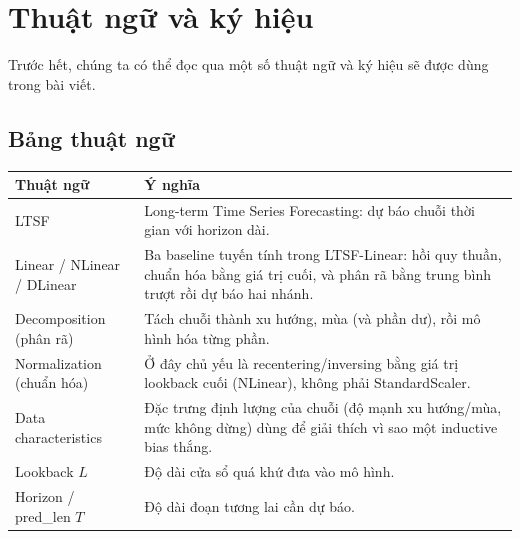 \section{Thuật ngữ và ký hiệu}
\label{sec:notation}

Trước hết, chúng ta có thể đọc qua một số thuật ngữ và ký hiệu sẽ được dùng trong bài viết.

\subsection{Bảng thuật ngữ}

\begin{center}
  \small
  \begin{tabular}{@{}>{\raggedright\arraybackslash}p{}
    >{\raggedright\arraybackslash}p{}@{}}
    \toprule
    \textbf{Thuật ngữ} & \textbf{Ý nghĩa}                                                                                        \\
    \midrule
    LTSF
                       & Long-term Time Series Forecasting: dự báo chuỗi thời gian với horizon dài.                              \\
    \addlinespace
    Linear / NLinear / DLinear
                       & Ba baseline tuyến tính trong LTSF-Linear: hồi quy thuần, chuẩn hóa bằng giá trị cuối,
    và phân rã bằng trung bình trượt rồi dự báo hai nhánh.                                                                       \\
    \addlinespace
    Decomposition (phân rã)
                       & Tách chuỗi thành xu hướng, mùa (và phần dư), rồi mô hình hóa từng phần.                                 \\
    \addlinespace
    Normalization (chuẩn hóa)
                       & Ở đây chủ yếu là recentering/inversing bằng giá trị lookback cuối (NLinear), không phải StandardScaler. \\
    \addlinespace
    Data characteristics
                       & Đặc trưng định lượng của chuỗi (độ mạnh xu hướng/mùa, mức không dừng) dùng để giải thích
    vì sao một inductive bias thắng.                                                                                             \\
    \addlinespace
    Lookback \(L\)
                       & Độ dài cửa sổ quá khứ đưa vào mô hình.                                                                  \\
    \addlinespace
    Horizon / pred\_len \(T\)
                       & Độ dài đoạn tương lai cần dự báo.                                                                       \\

\end{tabular}
\end{center}
